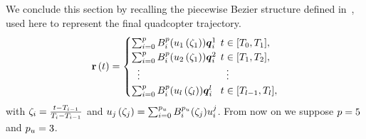 We conclude this section by recalling the piecewise B\acuteacc ezier structure defined in~,
used here to represent the final quadcopter trajectory.
\begin{equation}%
    \label{EQ:ST-SEPARATION-PIECEWISE}
	\rr \lp t \rp=
	\begin{cases}
		\sum_{i=0}^{\order} \basis_i^{\order}(\splinevar_1 \lp \clock_1 \rp) \bs{\cpoint}^1_i & \hspace{-0.2cm} t \in [T_0, T_1],\\
		\sum_{i=0}^{\order} \basis_i^{\order}(\splinevar_2 \lp \clock_1 \rp) \bs{\cpoint}^2_i & \hspace{-0.2cm} t \in [T_1, T_2],\\
		\hspace{0.2cm} \vdots & \vdots \\
		\sum_{i=0}^{\order} \basis_i^{\order}(\splinevar_{\segnumber} \lp \clock_{\segnumber} \rp) \bs{\cpoint}^{\segnumber}_i & \hspace{-0.2cm} t \in [T_{\segnumber-1}, T_{\segnumber}],\\
	\end{cases}
\end{equation}
with $\zeta_i = \frac{t-T_{i-1}}{T_{i}-T_{i-1}}$ and $u_j \left( \zeta_j \right) = \sum_{i=0}^{p_{u}} B_i^{p_{u}}(\zeta_j) u^j_i$.
From now on we suppose $p = 5$ and $p_{u} = 3$.

